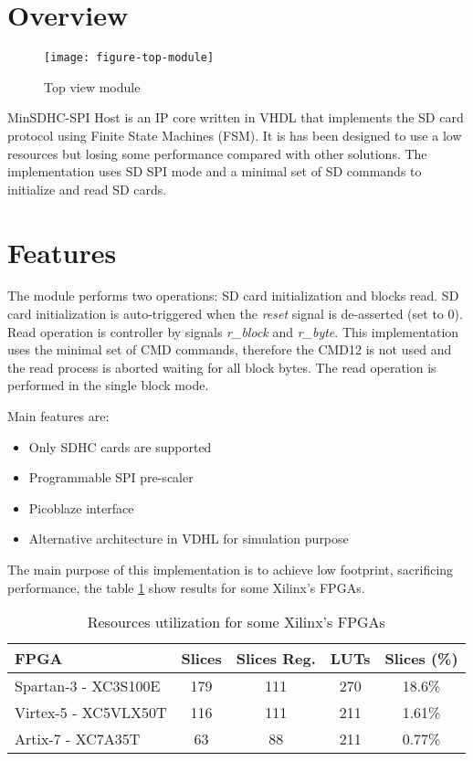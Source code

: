 \documentclass[oneside]{article}
\title{\pTitle}
\author{Paulino Ruiz-de-Clavijo V\'azquez \\ 
\emph{Departamento de Tecnología Electrónica, Universidad de Sevilla} }
\date{April, 2017 \pVersion}
\renewcommand*{\arraystretch}{1.3}
\begin{document}
\maketitle

\section*{Overview}

\begin{figure}[h]
\centering
\texttt{[image: figure-top-module]}
\caption{Top view module}
\label{fig-top}
\end{figure}

MinSDHC-SPI Host is an IP core written in VHDL that implements the SD card 
protocol using Finite State Machines (FSM). It is has been designed to use a 
low resources but losing some performance compared with other solutions. 
The implementation uses SD SPI mode 
and a minimal set of SD commands to initialize and read SD cards.

\section*{Features}

The module performs two operations: SD card initialization and blocks read. 
SD card initialization is auto-triggered when the \emph{reset} signal
is de-asserted (set to 0). Read operation is controller by signals 
\emph{r\_block} and \emph{r\_byte}. This implementation uses the minimal set of 
CMD  commands, therefore the CMD12 is not used and the read process is aborted 
waiting for all block bytes. The read operation is performed in the single block 
mode.

Main features are:

\begin{itemize}
\item Only SDHC cards are supported
\item Programmable SPI pre-scaler
\item Picoblaze interface
\item Alternative architecture in VDHL for simulation purpose
\end{itemize}

The main purpose of this implementation is to achieve low footprint, 
sacrificing performance, the table \ref{tab-resources} show results for some
Xilinx's FPGAs.

\begin{table}[ht]
\renewcommand*{\arraystretch}{1.3}
\centering
\begin{tabular}{ | l c c c c | }
\hline
  \bfseries FPGA & \bfseries Slices &
  \bfseries Slices Reg. & \bfseries LUTs & \bfseries Slices (\%) \\
 \hline
  Spartan-3 - XC3S100E & 179 &  111 &  270 & 18.6\%  \\ 
  Virtex-5 - XC5VLX50T & 116 &  111 &  211 &  1.61\% \\ 
  Artix-7 - XC7A35T    &  63 &   88 &  211 &  0.77\% \\ 
 \hline
\end{tabular}
\caption{Resources utilization for some Xilinx's FPGAs}
\label{tab-resources}
\end{table}
\end{document}

